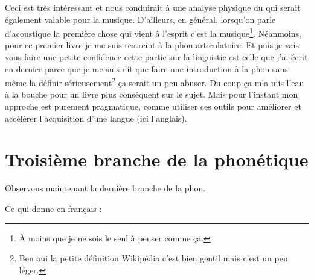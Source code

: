 Ceci est très intéressant et nous conduirait à une analyse physique du
\son qui serait également valable pour la musique. D'ailleurs, en
général, lorsqu'on parle d'acoustique la première chose qui vient à
l'esprit c'est la musique\footnote{À moins que je ne sois le seul à
  penser comme ça.}. Néanmoins, pour ce premier livre je me suis
restreint à la \gls{phon} articulatoire. Et puis je vais vous faire
une petite confidence cette partie sur la \gls{linguistic} est celle que
j'ai écrit en dernier parce que je me suis dit que faire une
introduction à la \gls{phon} sans même la définir
sérieusement\footnote{Ben oui la petite définition Wikipédia c'est
  bien gentil mais c'est un peu léger.} ça serait un peu abuser. Du
coup ça m'a mis l'eau à la bouche pour un livre plus conséquent sur le
sujet. Mais pour l'instant mon approche est purement pragmatique,
comme utiliser ces outils pour améliorer et accélérer l'acquisition
d'une langue (ici l'anglais).

\newpage

\section{Troisième branche de la phonétique}\label{sec:phon-t3}

Observons maintenant la dernière branche de la \gls{phon}.

\begin{center}
\begin{mdframed}[style=citestyle, frametitle={Extrait de~\cite{lodge}}]
\end{mdframed}  
\end{center}

Ce qui donne en français :

\begin{center}
\begin{mdframed}[style=tradstyle, frametitle={\exFR{Traduction} de l'extrait ci-dessus}]
\end{mdframed}  
\end{center}


